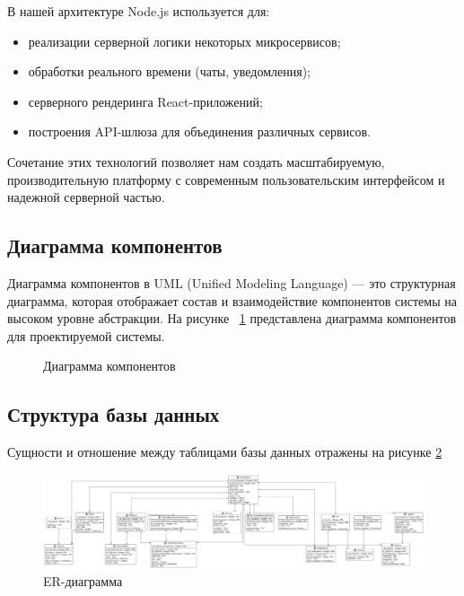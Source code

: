 В нашей архитектуре Node.js используется для:
\begin{itemize}
\item реализации серверной логики некоторых микросервисов;
\item обработки реального времени (чаты, уведомления);
\item серверного рендеринга React-приложений;
\item построения API-шлюза для объединения различных сервисов.
\end{itemize}

Сочетание этих технологий позволяет нам создать масштабируемую, производительную платформу с современным пользовательским интерфейсом и надежной серверной частью.

\subsection{Диаграмма компонентов}

Диаграмма компонентов в UML (Unified Modeling Language) — это структурная диаграмма, которая отображает состав и взаимодействие компонентов системы на высоком уровне абстракции. На рисунке  ~\ref{comp:image} представлена диаграмма компонентов для проектируемой системы.

\begin{figure}[H]
\caption{Диаграмма компонентов}
\label{comp:image}
\end{figure}

\subsection{Структура базы данных}

Сущности и отношение между таблицами базы данных отражены на рисунке \ref{place:image}

\begin{landscape} %
\begin{figure}[H]
\centering
\includegraphics[width=1\linewidth]{images/erdiag}
\caption{ER-диаграмма}
\label{place:image}
\end{figure}
\end{landscape}

